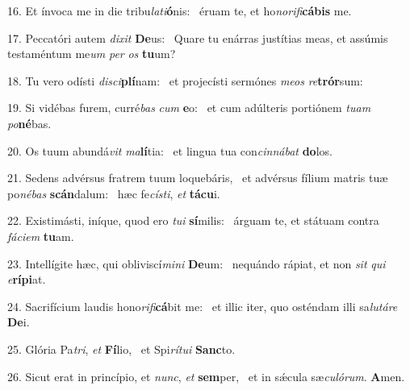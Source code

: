 16. Et ínvoca me in die tribu\textit{la}\textit{ti}\textbf{ó}nis: \ast\  éruam te, et ho\textit{no}\textit{ri}\textit{fi}\textbf{cá}\textbf{bis} me.\

17. Peccatóri autem \textit{di}\textit{xit} \textbf{De}us: \ast\  Quare tu enárras justítias meas, et assúmis testaméntum me\textit{um} \textit{per} \textit{os} \textbf{tu}um?\

18. Tu vero odísti \textit{di}\textit{sci}\textbf{plí}nam: \ast\  et projecísti sermónes \textit{me}\textit{os} \textit{re}\textbf{trór}sum:\

19. Si vidébas furem, curré\textit{bas} \textit{cum} \textbf{e}o: \ast\  et cum adúlteris portiónem \textit{tu}\textit{am} \textit{po}\textbf{né}bas.\

20. Os tuum abundá\textit{vit} \textit{ma}\textbf{lí}tia: \ast\  et lingua tua con\textit{cin}\textit{ná}\textit{bat} \textbf{do}los.\

21. Sedens advérsus fratrem tuum loquebáris, \dag\  et advérsus fílium matris tuæ po\textit{né}\textit{bas} \textbf{scán}dalum: \ast\  hæc fe\textit{cís}\textit{ti}, \textit{et} \textbf{tá}\textbf{cu}i.\

22. Existimásti, iníque, quod ero \textit{tu}\textit{i} \textbf{sí}milis: \ast\  árguam te, et státuam contra \textit{fá}\textit{ci}\textit{em} \textbf{tu}am.\

23. Intellígite hæc, qui obliviscí\textit{mi}\textit{ni} \textbf{De}um: \ast\  nequándo rápiat, et non \textit{sit} \textit{qui} \textit{e}\textbf{rí}\textbf{pi}at.\

24. Sacrifícium laudis hono\textit{ri}\textit{fi}\textbf{cá}bit me: \ast\  et illic iter, quo osténdam illi sa\textit{lu}\textit{tá}\textit{re} \textbf{De}i.\

25. Glória Pa\textit{tri}, \textit{et} \textbf{Fí}lio, \ast\  et Spi\textit{rí}\textit{tu}\textit{i} \textbf{Sanc}to.\

26. Sicut erat in princípio, et \textit{nunc}, \textit{et} \textbf{sem}per, \ast\  et in sǽcula sæ\textit{cu}\textit{ló}\textit{rum}. \textbf{A}men.\

